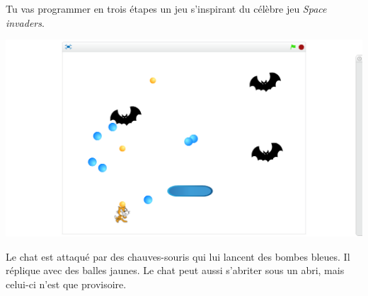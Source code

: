 \documentclass[class=report,crop=false, 12pt]{standalone}
\begin{document}




\bigskip
\bigskip


Tu vas programmer en trois étapes un jeu s'inspirant du célèbre jeu \emph{Space invaders}.

\begin{center}
  \includegraphics[scale=\scaleecran]{ecran-10-ex0} 
\end{center}

Le chat est attaqué par des chauves-souris qui lui lancent des bombes bleues. Il réplique avec des balles jaunes. Le chat peut aussi s'abriter sous un abri, mais celui-ci n'est que provisoire. 
\end{document}

